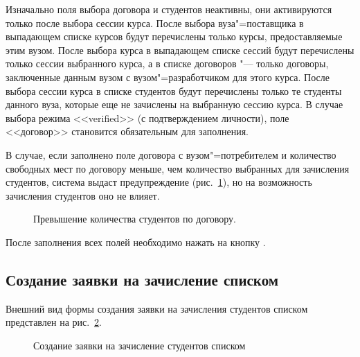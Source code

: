 Изначально поля выбора договора и студентов неактивны, они активируются только после выбора сессии курса.
После выбора вуза"=поставщика в выпадающем списке курсов будут перечислены только курсы, предоставляемые этим вузом.
После выбора курса в выпадающем списке сессий будут перечислены только сессии выбранного курса, 
а в списке договоров "--- только договоры, заключенные данным вузом с вузом"=разработчиком для этого курса.
После выбора сессии курса в списке студентов будут перечислены только те студенты данного вуза,
которые еще не зачислены на выбранную сессию курса.
В случае выбора режима <<verified>> (с подтверждением личности), поле <<договор>> становится обязательным для заполнения. 


В случае, если заполнено поле договора с вузом"=потребителем и количество свободных мест по договору меньше, 
чем количество выбранных для зачисления студентов, система выдаст предупреждение 
(рис.~\ref{img:student:enroll_req_create_student_error}), но на возможность зачисления студентов оно не влияет.

\begin{figure}[H]
	\caption{Превышение количества студентов по договору.}
	\label{img:student:enroll_req_create_student_error}
\end{figure}

После заполнения всех полей необходимо нажать на кнопку .

\subsection{Создание заявки на зачисление списком}
Внешний вид формы создания заявки на зачисления студентов списком представлен на рис.~\ref{img:student:mass_enroll_req_create}.

\begin{figure}[H]
	\caption{Создание заявки на зачисление студентов списком}
	\label{img:student:mass_enroll_req_create}
\end{figure}


